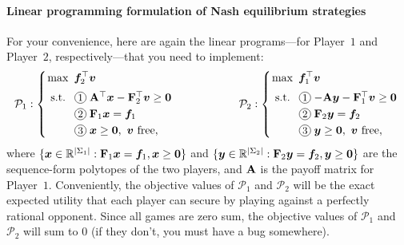 \documentclass{homework}
\begin{document}
\paragraph{Linear programming formulation of Nash equilibrium strategies}
For your convenience, here are again the linear programs---for Player~$1$ and Player~$2$, respectively---that you need to implement:
\begin{equation}\label{eq:nash lp}
    \arraycolsep=1.0pt
    \mathcal{P}_1 : \mleft\lbrace\begin{array}{l}
        \displaystyle\max~ \vec{f}_2^\top \vec{v}\\[2mm]
        \hspace{1mm}\text{\normalfont s.t.}~~ 
        \arraycolsep=1.4pt
        \begin{array}[t]{ll}
            \circled{1}   & \mat{A}^\top \vec{x} - \mat{F}_2^\top \vec{v} \ge \vec{0} \\[1mm]
            \circled{2}   & \mat{F}_1\vec{x}                      = \vec{f}_1 \\[1mm]
            \circled{3}   & \vec{x} \ge \vec{0},~\vec{v}~\text{free},
        \end{array} %
    \end{array}\mright.
    \hspace{2cm}
    \mathcal{P}_2 : \mleft\lbrace\begin{array}{l}
        \displaystyle\max~ \vec{f}_1^\top \vec{v}\\[2mm]
        \hspace{1mm}\text{\normalfont s.t.}~~ 
        \arraycolsep=1.4pt
        \begin{array}[t]{ll}
            \circled{1}   & -\mat{A} \vec{y} - \mat{F}_1^\top \vec{v} \ge \vec{0} \\[1mm]
            \circled{2}   & \mat{F}_2\vec{y}                      = \vec{f}_2 \\[1mm]
            \circled{3}   & \vec{y} \ge \vec{0},~\vec{v}~\text{free},
        \end{array} %
    \end{array}\mright.
\end{equation}
where $\{\bm{x}\in\mathbb{R}^{|\Sigma_1|}: \mathbf{F}_1 \bm{x} = \bm{f}_1, \bm{x}\ge\bm{0}\}$ and $\{\bm{y}\in\mathbb{R}^{|\Sigma_2|}: \mathbf{F}_2 \bm{y} = \bm{f}_2, \bm{y}\ge\bm{0}\}$ are the sequence-form polytopes of the two players, and $\mathbf{A}$ is the payoff matrix for Player~$1$. Conveniently, the objective values of $\mathcal{P}_1$ and $\mathcal{P}_2$ will be the exact expected utility that each player can secure by playing against a perfectly rational opponent. Since all games are zero sum, the objective values of $\mathcal{P}_1$ and $\mathcal{P}_2$ will sum to $0$ (if they don't, you must have a bug somewhere).
\end{document}
